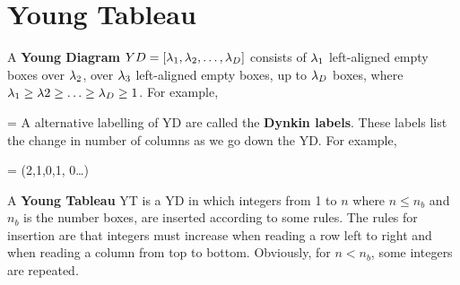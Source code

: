\chapter{Young Tableau}
\label{ch-young-tableau}

A {\bf Young Diagram} $YD=[\lambda_1, \lambda_2, \ldots, \lambda_D]$ 
consists of $\lambda_1$ left-aligned empty boxes
over $\lambda_2$, over 
$\lambda_3$ left-aligned empty boxes, up to
$\lambda_D$ boxes,
where $\lambda_1\geq \lambda2\geq \ldots\geq \lambda_D\geq 1$.
For example,

\beq
[4, 2,1,1]=
\eeq
A alternative labelling of YD are called the {\bf Dynkin labels}.
These labels list the change in number of columns as 
we go down the YD.
For example,

\beq
{}
=
(2,1,0,1, 0\ldots)
\eeq


A {\bf Young Tableau} YT is a YD in which integers from 1 to $n$ where $n\leq n_b$ and $n_b$ is the number boxes, are inserted according to some rules. The rules for insertion are that integers must increase when reading a row  left to right and
when reading a column from top to bottom. Obviously, for $n<n_b$, some integers are repeated.

